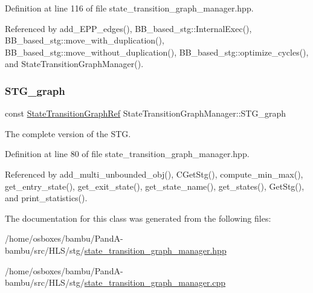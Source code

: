 Definition at line 116 of file state\+\_\+transition\+\_\+graph\+\_\+manager.\+hpp.



Referenced by add\+\_\+\+E\+P\+P\+\_\+edges(), B\+B\+\_\+based\+\_\+stg\+::\+Internal\+Exec(), B\+B\+\_\+based\+\_\+stg\+::move\+\_\+with\+\_\+duplication(), B\+B\+\_\+based\+\_\+stg\+::move\+\_\+without\+\_\+duplication(), B\+B\+\_\+based\+\_\+stg\+::optimize\+\_\+cycles(), and State\+Transition\+Graph\+Manager().

\mbox{\label{classStateTransitionGraphManager_a1de9563ff14d1cee745af2770b0ab90d}} 
\subsubsection{\texorpdfstring{S\+T\+G\+\_\+graph}{STG\_graph}}
{\footnotesize\ttfamily const \hyperlink{state__transition__graph_8hpp_a50ba60cd5e113de254d5d7638bbbba86}{State\+Transition\+Graph\+Ref} State\+Transition\+Graph\+Manager\+::\+S\+T\+G\+\_\+graph\hspace{0.3cm}{\ttfamily [private]}}



The complete version of the S\+TG. 



Definition at line 80 of file state\+\_\+transition\+\_\+graph\+\_\+manager.\+hpp.



Referenced by add\+\_\+multi\+\_\+unbounded\+\_\+obj(), C\+Get\+Stg(), compute\+\_\+min\+\_\+max(), get\+\_\+entry\+\_\+state(), get\+\_\+exit\+\_\+state(), get\+\_\+state\+\_\+name(), get\+\_\+states(), Get\+Stg(), and print\+\_\+statistics().



The documentation for this class was generated from the following files\+:\begin{DoxyCompactItemize}
\item 
/home/osboxes/bambu/\+Pand\+A-\/bambu/src/\+H\+L\+S/stg/\hyperlink{state__transition__graph__manager_8hpp}{state\+\_\+transition\+\_\+graph\+\_\+manager.\+hpp}\item 
/home/osboxes/bambu/\+Pand\+A-\/bambu/src/\+H\+L\+S/stg/\hyperlink{state__transition__graph__manager_8cpp}{state\+\_\+transition\+\_\+graph\+\_\+manager.\+cpp}\end{DoxyCompactItemize}
